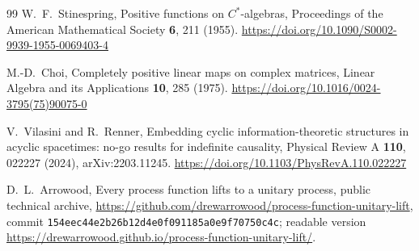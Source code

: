 \documentclass[11pt]{article}
\theoremstyle{definition}
\theoremstyle{remark}
\begin{document}
\begin{thebibliography}{99}
W.~F.~Stinespring,
Positive functions on \(C^{*}\)-algebras,
Proceedings of the American Mathematical Society \textbf{6}, 211 (1955).
\url{https://doi.org/10.1090/S0002-9939-1955-0069403-4}

M.-D.~Choi,
Completely positive linear maps on complex matrices,
Linear Algebra and its Applications \textbf{10}, 285 (1975).
\url{https://doi.org/10.1016/0024-3795(75)90075-0}

V.~Vilasini and R.~Renner,
Embedding cyclic information-theoretic structures in acyclic spacetimes: no-go results for indefinite causality,
Physical Review A \textbf{110}, 022227 (2024),
arXiv:2203.11245.
\url{https://doi.org/10.1103/PhysRevA.110.022227}

D.~L.~Arrowood,
Every process function lifts to a unitary process,
public technical archive,
\url{https://github.com/drewarrowood/process-function-unitary-lift},
commit \texttt{154eec44e2b26b12d4e0f091185a0e9f70750c4c};
readable version \url{https://drewarrowood.github.io/process-function-unitary-lift/}.

\end{thebibliography}
\end{document}

